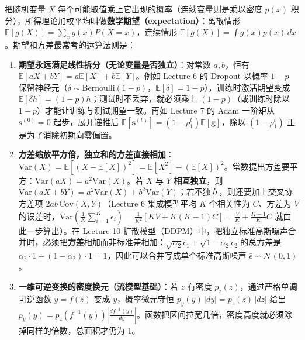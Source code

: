 把随机变量 \(X\) 每个可能取值乘上它出现的概率（连续变量则是乘以密度 \(p(x)\) 积分），所得理论加权平均叫做\textbf{数学期望（expectation）}：离散情形 \(\mathbb{E}[g(X)] = \sum_x g(x)P(X=x)\)，连续情形 \(\mathbb{E}[g(X)] = \int g(x)p(x)\,dx\)。期望和方差最常考的运算法则是：
\begin{enumerate}[start=1]
\item \textbf{期望永远满足线性拆分（无论变量是否独立）}：对常数 \(a, b\)，恒有 \(\mathbb{E}[aX + bY] = a\mathbb{E}[X] + b\mathbb{E}[Y]\)。例如 Lecture 6 的 Dropout 以概率 \(1-p\) 保留神经元（\(\delta \sim \mathrm{Bernoulli}(1-p)\)，\(\mathbb{E}[\delta] = 1-p\)），训练时激活期望变成 \(\mathbb{E}[\delta h] = (1-p)h\)；测试时不丢弃，就必须乘上 \((1-p)\)（或训练时除以 \(1-p\)）才能让训练与测试期望一致。再如 Lecture 7 的 Adam 一阶矩从 \(\mathbf{s}^{(0)} = 0\) 起步，展开递推后 \(\mathbb{E}[\mathbf{s}^{(t)}] = (1 - \rho_1^t)\mathbb{E}[\mathbf{g}]\)，除以 \((1 - \rho_1^t)\) 正是为了消除初期向零偏置。
\item \textbf{方差缩放平方倍，独立和的方差直接相加}：\(\mathrm{Var}(X) = \mathbb{E}[(X - \mathbb{E}[X])^2] = \mathbb{E}[X^2] - (\mathbb{E}[X])^2\)。常数提出方差要平方：\(\mathrm{Var}(aX) = a^2 \mathrm{Var}(X)\)。若 \(X\) 与 \(Y\) \textbf{相互独立}，则 \(\mathrm{Var}(aX + bY) = a^2\mathrm{Var}(X) + b^2\mathrm{Var}(Y)\)；若不独立，则还要加上交叉协方差项 \(2ab\,\mathrm{Cov}(X, Y)\)（Lecture 6 集成模型平均 \(K\) 个相关性为 \(C\)、方差为 \(V\) 的误差时，\(\mathrm{Var}(\frac{1}{K}\sum_{i=1}^K \epsilon_i) = \frac{1}{K^2}[K V + K(K-1)C] = \frac{V}{K} + \frac{K-1}{K}C\) 就由此一步算出）。在 Lecture 10 扩散模型（DDPM）中，把独立标准高斯噪声合并时，必须把\textbf{方差}相加而非标准差相加：\(\sqrt{\alpha_2}\epsilon_1 + \sqrt{1-\alpha_2}\epsilon_2\) 的总方差是 \(\alpha_2\cdot 1 + (1-\alpha_2)\cdot 1 = 1\)，因此可以合并写成单个标准高斯噪声 \(\bar{\epsilon} \sim \mathcal{N}(0, 1)\)。
\item \textbf{一维可逆变换的密度换元（流模型基础）}：若 \(z\) 有密度 \(p_z(z)\)，通过严格单调可逆函数 \(y = f(z)\) 变成 \(y\)，概率微元守恒 \(p_y(y)\,|dy| = p_z(z)\,|dz|\) 给出 \(p_y(y) = p_z(f^{-1}(y))\left|\frac{df^{-1}(y)}{dy}\right|\)。函数把区间拉宽几倍，密度高度就必须除掉同样的倍数，总面积才仍为 1。
\end{enumerate}




